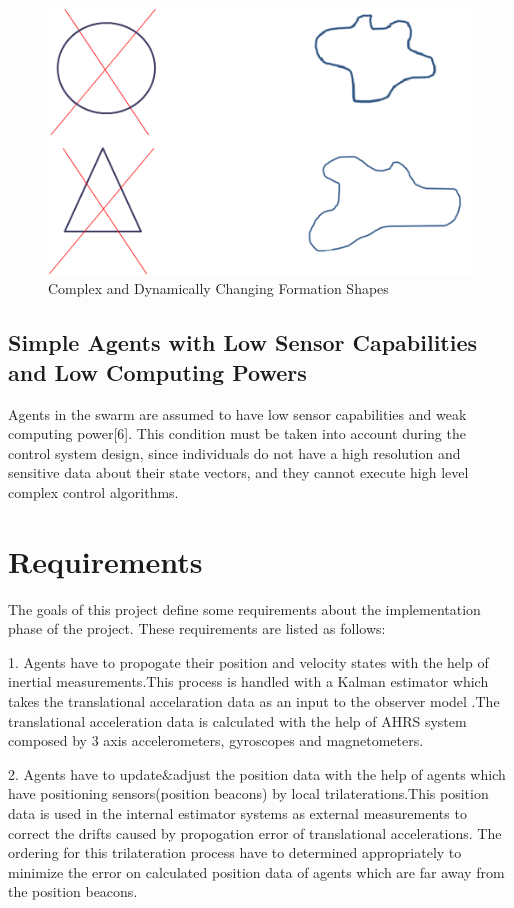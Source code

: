 \begin{figure}[H]
\caption{Complex and Dynamically Changing Formation Shapes}
\centering
\includegraphics[scale = 1]{complex}
\end{figure}

\subsection{Simple Agents with Low Sensor Capabilities and Low Computing Powers}
Agents in the swarm are assumed to have low sensor capabilities and weak computing power[6]. This condition must be taken into account during the control system design, since individuals do not have a high resolution and sensitive data about their state vectors, and they cannot execute high level complex control algorithms.

\section{Requirements}
The goals of this project define some requirements about the implementation phase of the project. These requirements are listed as follows:

1. Agents have to propogate their position and velocity states with the help of inertial measurements.This process is handled with a Kalman estimator which takes the translational accelaration data as an input to the observer model .The translational acceleration data is calculated with the help of AHRS system composed by 3 axis accelerometers, gyroscopes and magnetometers. 

2. Agents have to update$\&$adjust the position data with the help of agents which have positioning sensors(position beacons) by local trilaterations.This position data is used in the internal estimator systems as external measurements to correct the drifts caused by propogation error of translational accelerations.  The ordering for this trilateration process have to determined appropriately to minimize the error on calculated position data of agents which are far away from the position beacons.

